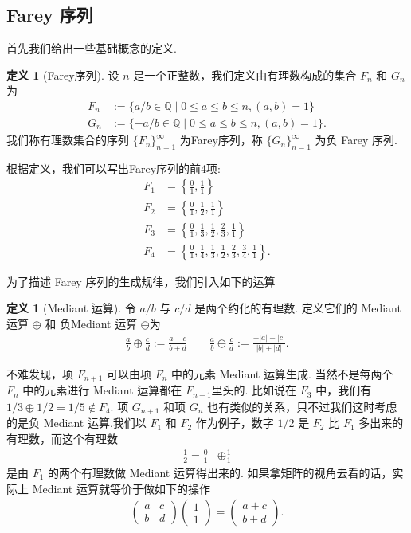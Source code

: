 \documentclass[10pt,UTF8]{ctexart}
\newcommand{\Q}{\mathbb{Q}}
\theoremstyle{definition}
\newtheorem{definition}[theorem]{定义}
\theoremstyle{remark}
\begin{document}
\subsection{Farey 序列}
首先我们给出一些基础概念的定义.
\begin{definition}[Farey序列]
    设 $n$ 是一个正整数，我们定义由有理数构成的集合 $F_n$ 和 $G_n$ 为
    \begin{align*}
        F_n &:=\{a/b\in\Q \mid 0\le a \le b \le n,(a,b)=1\}\\
        G_n &:= \{-a/b\in\Q \mid 0\le a \le b \le n,(a,b)=1\}.
    \end{align*}
    我们称有理数集合的序列 $\{F_n\}_{n=1}^{\infty}$ 为Farey序列，称 $\{G_n\}_{n=1}^\infty$ 为负 Farey 序列. 
\end{definition}
根据定义，我们可以写出Farey序列的前4项:
\begin{align*}
    F_1 &= \left\{ \frac{0}{1}, \frac{1}{1} \right\}\\ 
    F_2 &= \left\{ \frac{0}{1}, \frac{1}{2}, \frac{1}{1} \right\} \\
    F_3 &= \left\{ \frac{0}{1}, \frac{1}{3}, \frac{1}{2}, \frac{2}{3}, \frac{1}{1} \right\}\\
    F_4 &= \left\{ \frac{0}{1}, \frac{1}{4}, \frac{1}{3}, \frac{1}{2}, \frac{2}{3}, \frac{3}{4}, \frac{1}{1} \right\}.
\end{align*}

为了描述 Farey 序列的生成规律，我们引入如下的运算


\begin{definition}[Mediant 运算]
    令 $a/b$ 与 $c/d$ 是两个约化的有理数. 定义它们的 Mediant 运算 $\oplus$ 和 负Mediant 运算 $\ominus$为
        \begin{align*}
        \frac{a}{b} \oplus \frac{c}{d}:= \frac{a+c}{b+d} \qquad 
        \frac{a}{b} \ominus \frac{c}{d}:= \frac{-|a|-|c|}{|b|+|d|}.
    \end{align*}
\end{definition}

不难发现，项 $F_{n+1}$ 可以由项 $F_{n}$ 中的元素 Mediant 运算生成. 当然不是每两个 $F_n$ 中的元素进行 Mediant 运算都在 $F_{n+1}$里头的. 
比如说在 $F_3$ 中，我们有 $1/3\oplus 1/2 =1/5 \notin F_4$.
项 $G_{n+1}$ 和项 $G_n$ 也有类似的关系，只不过我们这时考虑的是负 Mediant 运算.我们以 $F_1$ 和 $F_2$ 作为例子，数字 $1/2$ 是 $F_2$ 比 $F_1$ 多出来的有理数，而这个有理数
\begin{align*}
    \frac{1}{2} = \frac{0}{1} &\oplus \frac{1}{1}
\end{align*}
是由 $F_1$ 的两个有理数做 Mediant 运算得出来的. 
如果拿矩阵的视角去看的话，实际上 Mediant 运算就等价于做如下的操作
\begin{align*}
    \begin{pmatrix} a & c \\ b & d \end{pmatrix} \begin{pmatrix} 1\\1 \end{pmatrix}  = \begin{pmatrix} a+c\\b+d \end{pmatrix}.
\end{align*}
\end{document}
